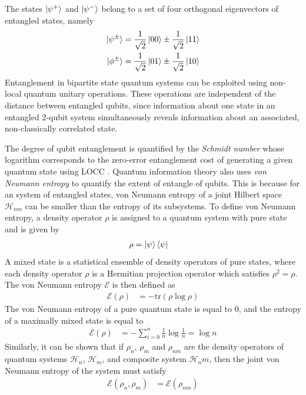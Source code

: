The states $\ket{\psi^+}$ and $\ket{\psi^-}$ belong to a set of four orthogonal eigenvectors of entangled states, namely
\begin{align}
	\ket{\psi^\pm} & = \frac{1}{\sqrt{2}}\ket{00} \pm \frac{1}{\sqrt{2}}\ket{11}\\
	\ket{\phi^\pm} & = \frac{1}{\sqrt{2}}\ket{01} \pm \frac{1}{\sqrt{2}}\ket{10}
\end{align}
Entanglement in bipartite state quantum systems can be exploited using non-local quantum unitary operations. These operations are independent of the distance between entangled qubits, since information about one state in an entangled 2-qubit system simultaneously reveals information about an associated, non-classically correlated state.

The degree of qubit entanglement is quantified by the \textit{Schmidt number} whose logarithm corresponds to the zero-error entanglement cost of generating a given quantum state using LOCC \cite{Gupta2020}. Quantum information theory also uses \textit{von Neumann entropy} to quantify the extent of entangle of qubits. This is because for an system of entangled states, von Neumann entropy of a joint Hilbert space $\mathcal{H}_{nm}$ can be smaller than the entropy of its subsystems. To define von Neumann entropy, a density operator $\rho$ is assigned to a quantum system with pure state and is given by
\begin{align}
	\rho	& = \ket{\psi}\bra{\psi}
\end{align}
A mixed state is a statistical ensemble of density operators of pure states, where each density operator $\rho$ is a Hermitian projection operator which satisfies $\rho^2 = \rho$. The von Neumann entropy $\mathcal{E}$ is then defined as
\begin{align}
	\mathcal{E}(\rho)	& = -\text{tr}(\rho \log \rho)
\end{align}
The von Neumann entropy of a pure quantum state is equal to 0, and the entropy of a maximally mixed state is equal to
\begin{align}
	\mathcal{E}(\rho)	& = - \sum_{i=0}^{n} \frac{1}{n} \log \frac{1}{n} = \log n
\end{align}
Similarly, it can be shown that if $\rho_n$, $\rho_m$ and $\rho_{nm}$ are the density operators of quantum systems $\mathcal{H}_n$, $\mathcal{H}_m$, and composite system $\mathcal{H}_nm$, then the joint von Neumann entropy of the system must satisfy
\begin{align}
	\mathcal{E}(\rho_n, \rho_m) & = \mathcal{E}(\rho_{nm})
\end{align}
